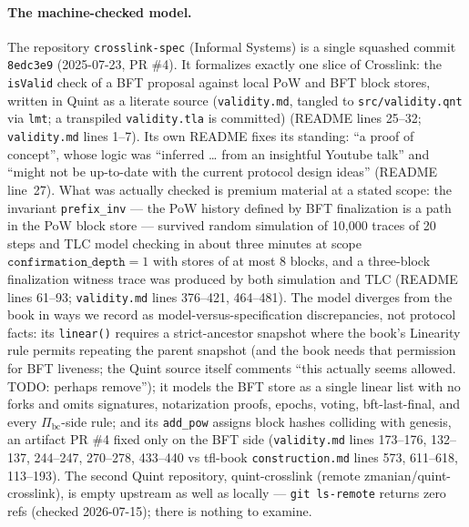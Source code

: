 \documentclass[11pt,a4paper]{article}
\theoremstyle{definition}
\begin{document}
\paragraph{The machine-checked model.} The repository
\texttt{crosslink-spec} (Informal Systems) is a single squashed commit
\texttt{8edc3e9} (2025-07-23, PR \#4).
It formalizes exactly one slice of Crosslink: the \texttt{isValid} check
of a BFT proposal against local PoW and BFT block stores, written in
Quint as a literate source (\texttt{validity.md}, tangled to
\texttt{src/validity.qnt} via \texttt{lmt}; a transpiled
\texttt{validity.tla} is committed) (README lines 25--32;
\texttt{validity.md} lines 1--7). Its own README fixes its standing: ``a
proof of concept'', whose logic was ``inferred \ldots{} from an
insightful Youtube talk'' and ``might not be up-to-date with the current
protocol design ideas'' (README line~27). What was actually checked is
premium material at a stated scope: the invariant \texttt{prefix\_inv}
--- the PoW history defined by BFT finalization is a path in the PoW
block store --- survived random simulation of 10{,}000 traces of 20
steps and TLC model checking in about three minutes at scope
$\texttt{confirmation\_depth}=1$ with stores of at most 8 blocks, and a
three-block finalization witness trace was produced by both simulation
and TLC (README lines 61--93; \texttt{validity.md} lines 376--421,
464--481). The model diverges from the book in ways we record as
model-versus-specification discrepancies, not protocol facts: its
\texttt{linear()} requires a strict-ancestor snapshot where the book's
Linearity rule permits repeating the parent snapshot (and the book needs
that permission for BFT liveness; the Quint source itself comments
``this actually seems allowed. TODO: perhaps remove''); it models the
BFT store as a single linear list with no forks and omits signatures,
notarization proofs, epochs, voting, bft-last-final, and every
$\Pi_{\mathrm{bc}}$-side rule; and its \texttt{add\_pow} assigns block
hashes colliding with genesis, an artifact PR \#4 fixed only on the BFT
side (\texttt{validity.md} lines 173--176, 132--137, 244--247, 270--278,
433--440 vs tfl-book \texttt{construction.md} lines 573, 611--618,
113--193). The second Quint repository, quint-crosslink (remote
zmanian/quint-crosslink), is empty upstream as well as locally ---
\texttt{git ls-remote} returns zero refs (checked 2026-07-15); there is
nothing to examine.
\end{document}

